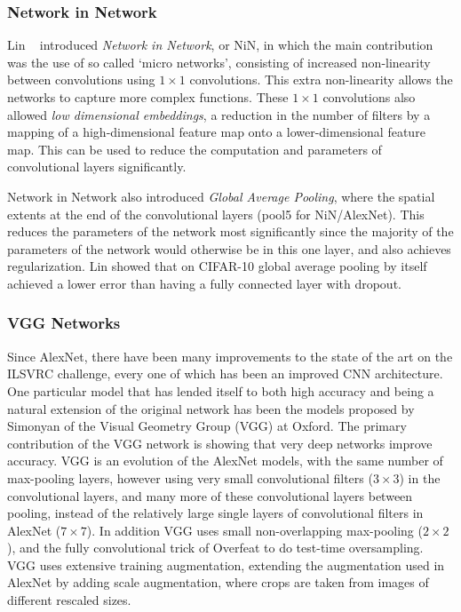 \documentclass[thesis]{subfiles}
\begin{document}
\subsubsection{Network in Network}
Lin \etal~\cite{Lin2013NiN} introduced \emph{Network in Network}, or NiN, in which the main contribution was the use of so called `micro networks', consisting of increased non-linearity between convolutions using $1\times 1$ convolutions. This extra non-linearity allows the networks to capture more complex functions. These $1\times 1$ convolutions also allowed \emph{low dimensional embeddings}, \ie a reduction in the number of filters by a mapping of a high-dimensional feature map onto a lower-dimensional feature map. This can be used to reduce the computation and parameters of convolutional layers significantly. 

Network in Network also introduced \emph{Global Average Pooling}, where the spatial extents at the end of the convolutional layers (\ie pool5 for NiN/AlexNet). This reduces the parameters of the network most significantly since the majority of the parameters of the network would otherwise be in this one layer, and also achieves regularization. Lin \etal showed that on CIFAR-10 global average pooling by itself achieved a lower error than having a fully connected layer with dropout.


\subsubsection{VGG Networks}
Since AlexNet, there have been many improvements to the state of the art on the ILSVRC challenge, every one of which has been an improved CNN architecture. One particular model that has lended itself to both high accuracy and being a natural extension of the original network has been the models proposed by Simonyan \etal of the Visual Geometry Group (VGG) at Oxford. The primary contribution of the VGG network is showing that very deep networks improve accuracy. VGG is an evolution of the AlexNet models, with the same number of max-pooling layers, however using very small convolutional filters ($3 \times 3$) in the convolutional layers, and many more of these convolutional layers between pooling, instead of the relatively large single layers of convolutional filters in AlexNet ($7\times 7$). In addition VGG uses small non-overlapping max-pooling ($2\times 2$), and the fully convolutional trick of Overfeat to do test-time oversampling. VGG uses extensive training augmentation, extending the augmentation used in AlexNet by adding scale augmentation, where crops are taken from images of different rescaled sizes. 
\end{document}
